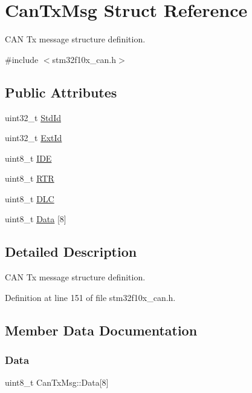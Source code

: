 \hypertarget{struct_can_tx_msg}{}\section{Can\+Tx\+Msg Struct Reference}
\label{struct_can_tx_msg}


C\+AN Tx message structure definition.  




{\ttfamily \#include $<$stm32f10x\+\_\+can.\+h$>$}

\subsection*{Public Attributes}
\begin{DoxyCompactItemize}
\item 
uint32\+\_\+t \hyperlink{struct_can_tx_msg_abfb50c8208227f8cf378f29cf9a3a6f3}{Std\+Id}
\item 
uint32\+\_\+t \hyperlink{struct_can_tx_msg_a33050a95a4cc463b589ff16bdd416f22}{Ext\+Id}
\item 
uint8\+\_\+t \hyperlink{struct_can_tx_msg_aa4c8568a0e3250a17bd7e116b3e09670}{I\+DE}
\item 
uint8\+\_\+t \hyperlink{struct_can_tx_msg_a69f84255db38c6910058f290efdb7302}{R\+TR}
\item 
uint8\+\_\+t \hyperlink{struct_can_tx_msg_ab49d0fa602aad2fd9cd007adafc11fc2}{D\+LC}
\item 
uint8\+\_\+t \hyperlink{struct_can_tx_msg_aabfbf718f627da26d9e3cf903dc0ad02}{Data} \mbox{[}8\mbox{]}
\end{DoxyCompactItemize}


\subsection{Detailed Description}
C\+AN Tx message structure definition. 

Definition at line 151 of file stm32f10x\+\_\+can.\+h.



\subsection{Member Data Documentation}
\mbox{\label{struct_can_tx_msg_aabfbf718f627da26d9e3cf903dc0ad02}} 
\subsubsection{\texorpdfstring{Data}{Data}}
{\footnotesize\ttfamily uint8\+\_\+t Can\+Tx\+Msg\+::\+Data\mbox{[}8\mbox{]}}

